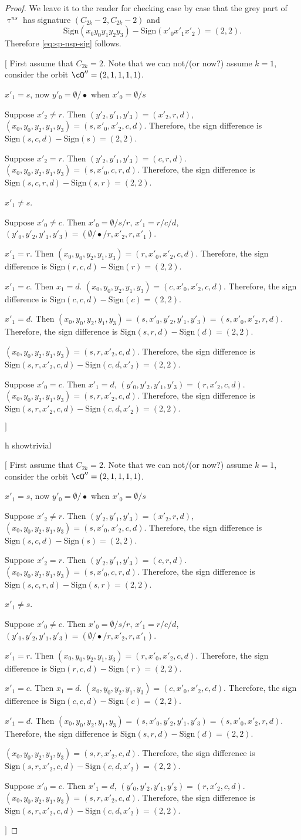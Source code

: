 \documentclass[12pt,a4paper]{amsart}
\newcommand{\trivial}[2][]{\if\relax\detokenize{#1}\relax
  {%
      \color{orange} \vspace{0em} $[$  #2 $]$
      \color{black}
  }
  \else
\ifx#1h
\ifcsname showtrivial\endcsname
{%
    \color{orange} \vspace{0em}  $[$ #2 $]$
    \color{black}
}
\fi
\else {\red Wrong argument!} \fi
\fi
}
\numberwithin{equation}{section}
\theoremstyle{remark}
\def\ssign{\mathrm{Sign}}
\def\cOpp{\cO^{\prime\prime}}
\begin{document}
\begin{proof}
  We leave it to the reader for checking case by case that the grey part of $\uptau^{ns}$ has signature
  $(C_{2k}-2,C_{2k}-2)$ and
  \[\ssign(x_{0}y_{0}y_{1}y_{2}y_{3})-\ssign(x'_{0}x'_{1}x'_{2})=(2,2).
  \]
 Therefore \eqref{eq:sp-nsp-sig} follows.

 \trivial[]{
   First assume that $C_{2k}=2$. Note that we can not/(or now?) assume $k=1$, consider the
   orbit $\cOpp=(2,1,1,1,1)$.
   \begin{enumPF}
     \item
     $x'_{1}=s$, now $y'_{0} = \emptyset/\bullet$ when $x'_{0}=\emptyset/s$
     \begin{enumPF}
       \item Suppose $x'_{2}\neq r$. Then $(y'_{2},y'_{1},y'_{3}) = (x'_{2},r,d)$,
       $(x_{0},y_{0},y_{2},y_{1},y_{3}) = (s,x'_{0}, x'_{2},c,d)$.
       Therefore, the sign difference is $\ssign(s,c,d)-\ssign(s)=(2,2)$.
       \item Suppose $x'_{2} = r$. Then $(y'_{2},y'_{1},y'_{3}) = (c,r,d)$.
       $(x_{0},y_{0},y_{2},y_{1},y_{3}) = (s,x'_{0},c,r,d)$.
       Therefore, the sign difference is $\ssign(s,c,r,d)-\ssign(s,r)=(2,2)$.
     \end{enumPF}
     \item $x'_{1}\neq s$.
     \begin{enumPF}
       \item Suppose $x'_{0}\neq c$.
       Then $x'_{0}=\emptyset/s/r$, $x'_{1}=r/c/d$, $(y'_{0}, y'_{2},y'_{1},y'_{3}) = (\emptyset/\bullet/r,x'_{2},r,x'_{1})$.
       \begin{enumPF}
         \item $x'_{1}=r$. Then
         $(x_{0},y_{0},y_{2},y_{1},y_{3}) = (r,x'_{0},x'_{2},c,d)$.
         Therefore, the sign difference is $\ssign(r,c,d)-\ssign(r)=(2,2)$.
         \item $x'_{1}=c$. Then  $x_{1}=d$.
         $(x_{0},y_{0},y_{2},y_{1},y_{3}) = (c,x'_{0},x'_{2},c,d)$.
         Therefore, the sign difference is $\ssign(c,c,d)-\ssign(c)=(2,2)$.
         \item $x'_{1}=d$. Then
         $(x_{0},y_{0},y_{2},y_{1},y_{3}) = (s,x'_{0},y'_{2},y'_{1},y'_{3})=(s,x'_{0},x'_{2},r,d)$.
         Therefore, the sign difference is $\ssign(s,r,d)-\ssign(d)=(2,2)$.
       \end{enumPF}
       $(x_{0},y_{0},y_{2},y_{1},y_{3}) = (s,r,x'_{2},c,d)$.
       Therefore, the sign difference is $\ssign(s,r,x'_{2},c,d)-\ssign(c,d,x'_{2})=(2,2)$.
       \item Suppose $x'_{0} = c$.
       Then $x'_{1}=d$, $(y'_{0}, y'_{2},y'_{1},y'_{3}) = (r,x'_{2},c,d)$.
       $(x_{0},y_{0},y_{2},y_{1},y_{3}) = (s,r,x'_{2},c,d)$.
       Therefore, the sign difference is $\ssign(s,r,x'_{2},c,d)-\ssign(c,d,x'_{2})=(2,2)$.
     \end{enumPF}
   \end{enumPF}
   }
 \end{proof}
\end{document}
